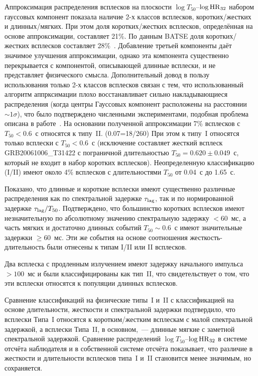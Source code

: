 Аппроксимация распределения всплесков на плоскости $\log T_{50}$--$\log {\mathrm{HR}}_{32}$ 
набором гауссовых компонент показала наличие 2-х классов всплесков, коротких/жестких 
и длинных/мягких. При этом доля коротких/жестких всплесков, определённая на основе 
аппроксимации, составляет 21\%. По данным  BATSE доля коротких/жестких всплесков 
составляет 28\%~\citep{Horvath_2002}.  
Добавление третьей компоненты даёт значимое улучшения аппроксимации, однако эта 
компонента существенно перекрывается с компонентой, описывающей длинные всплески, 
и не представляет физического смысла. Дополнительный довод в пользу использования
только 2-х классов всплесков связан с тем, что использованный алгоритм аппрксимации
плохо восстанавливает сильно накладывающиеся распределения 
(когда центры Гауссовых компонент расположены на расстоянии $\sim 1\sigma$),
что было подтверждено численными экспериментами, подобная проблема 
описана в работе~\citep{Igoshev_2013MNRAS}.
На основании полученной аппроксимации 7\% всплесков с $T_{50} < 0.6$~с относятся к типу~II.  (0.07=18/260)
При этом к типу~I относятся только всплески с $T_{50} < 0.6$~с 
(исключение составляет жесткий всплеск GRB20061006\_T31422 с пограничной  длительностью $T_{50} = 0.620\pm 0.049$~с, 
который не входит в набор коротких всплесков). Неопределенную классификацию (I/II) имеют 
около 4\% всплесков с длительностями $T_{50}$ от 0.04~с до 1.65~с.
 
Показано, что длинные и короткие всплески имеют существенно различные распределения 
как по спектральной задержке $\tau_{\mathrm{lag}}$, так и по нормированной задержке 
$\tau_{\mathrm{lag}} / T_{50}$. Подтверждено, что большинство коротких всплесков 
имеют незначительную по абсолютному значению спектральную задержку $< 60$~мс, 
а часть мягких и достаточно длинных событий $T_{50}\sim 0.6$~с имеют 
значительные задержки $\geq 60$~мс. Эти же события на основе соотношения 
жесткость-длительность были отнесены к типам I/II или II всплесков. 

Два всплеска с продленным излучением имеют задержку начального импульса $> 100$~мс
и были классифицированы как тип~II, что свидетельствует о том, что
эти всплески относятся к популяции длинных всплесков.  

Сравнение классификаций на физические типы~I и~II с классификацией на основе 
длительности, жесткости и спектральной задержки подтвердило, что всплески Типа~I 
относятся к коротким/жестким всплескам с малой спектральной задержкой, а всплески 
Типа~II, в основном,~--- длинные мягкие с заметной спектральной задержкой. 
Сравнение распределений $\log T_{50}$--$\log {\mathrm{HR}}_{32}$ в системе отсчёта наблюдателя 
и в собственной системе отсчёта показывает, что различие в жесткости и длительности
всплесков типа~I и~II становится менее значимым, но сохраняется.

